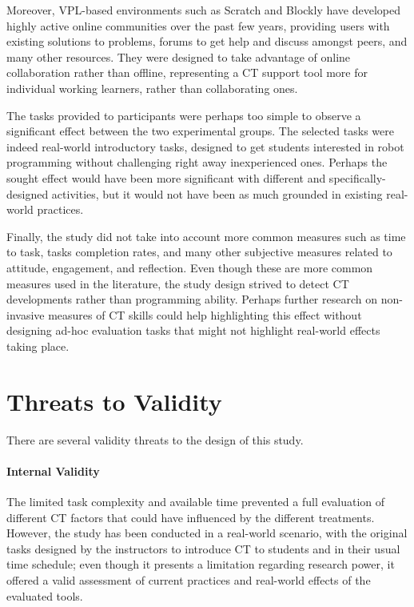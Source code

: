 Moreover, \ac{VPL}-based environments such as Scratch and Blockly have developed highly active online communities over the past few years, providing users with existing solutions to problems, forums to get help and discuss amongst peers, and many other resources. They were designed to take advantage of online collaboration rather than offline, representing a \ac{CT} support tool more for individual working learners, rather than collaborating ones.

The tasks provided to participants were perhaps too simple to observe a significant effect between the two experimental groups. The selected tasks were indeed real-world introductory tasks, designed to get students interested in robot programming without challenging right away inexperienced ones. Perhaps the sought effect would have been more significant with different and specifically-designed activities, but it would not have been as much grounded in existing real-world practices.

Finally, the study did not take into account more common measures such as time to task, tasks completion rates, and many other subjective measures related to attitude, engagement, and reflection. Even though these are more common measures used in the literature, the study design strived to detect \ac{CT} developments rather than programming ability. Perhaps further research on non-invasive measures of \ac{CT} skills could help highlighting this effect without designing ad-hoc evaluation tasks that might not highlight real-world effects taking place.

\section{Threats to Validity}
There are several validity threats to the design of this study.

\paragraph{Internal Validity} The limited task complexity and available time prevented a full evaluation of different \ac{CT} factors that could have influenced by the different treatments. However, the study has been conducted in a real-world scenario, with the original tasks designed by the instructors to introduce \ac{CT} to students and in their usual time schedule; even though it presents a limitation regarding research power, it offered a valid assessment of current practices and real-world effects of the evaluated tools.

